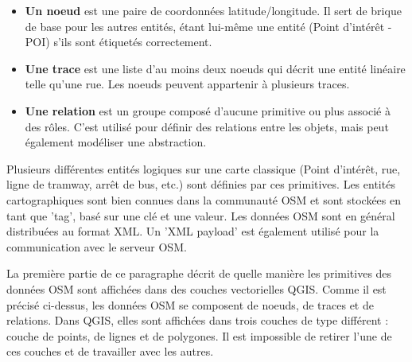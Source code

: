 \begin{itemize}
\item \textbf{Un noeud} est une paire de coordonnées latitude/longitude. Il sert de brique de base pour les autres entités, étant lui-même une entité (Point d'intérêt - POI) s'ils sont étiquetés correctement.
\item \textbf{Une trace} est une liste d'au moins deux noeuds qui décrit une entité linéaire telle qu'une rue. Les noeuds peuvent appartenir à plusieurs traces.
\item \textbf{Une relation} est un groupe composé d'aucune primitive ou plus associé à des rôles. C'est utilisé pour définir des relations entre les objets, mais peut également modéliser une abstraction.
\end{itemize}

Plusieurs différentes entités logiques sur une carte classique (Point d'intérêt, rue, ligne de tramway, arrêt de bus, etc.) sont définies par ces primitives. Les entités cartographiques sont bien connues dans la communauté OSM et sont stockées en tant que 'tag', basé sur une clé et une valeur. Les données OSM sont en général distribuées au format XML. Un 'XML payload' est également utilisé pour la communication avec le serveur OSM.

\label{qgis-osm-connection}

La première partie de ce paragraphe décrit de quelle manière les primitives des données OSM sont affichées dans des couches vectorielles QGIS. Comme il est précisé ci-dessus, les données OSM se composent de noeuds, de traces et de relations. Dans QGIS, elles sont affichées dans trois couches de type différent : couche de points, de lignes et de polygones. Il est impossible de retirer l'une de ces couches et de travailler avec les autres.

